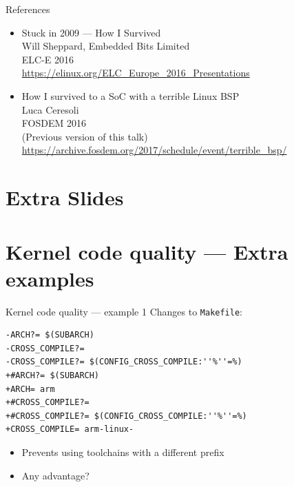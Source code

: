 \documentclass[xetex,table,aspectratio=169]{beamer}
\begin{document}
\begin{frame}{References}
  \begin{itemize}
    \item
      Stuck in 2009 --- How I Survived\\
      Will Sheppard, Embedded Bits Limited\\
      ELC-E 2016\\
      {\scriptsize\url{https://elinux.org/ELC_Europe_2016_Presentations}}
    \item
      How I survived to a SoC with a terrible Linux BSP\\
      Luca Ceresoli\\
      FOSDEM 2016\\
      (Previous version of this talk)\\
      {\scriptsize\url{https://archive.fosdem.org/2017/schedule/event/terrible_bsp/}}
  \end{itemize}
\end{frame}

\appendix

\section{Extra Slides}

\section{Kernel code quality --- Extra examples}

\begin{frame}[fragile]{Kernel code quality --- example 1}
  Changes to \texttt{Makefile}:

  \begin{verbatim}
-ARCH?= $(SUBARCH)
-CROSS_COMPILE?=
-CROSS_COMPILE?= $(CONFIG_CROSS_COMPILE:''%''=%)
+#ARCH?= $(SUBARCH)
+ARCH= arm
+#CROSS_COMPILE?=
+#CROSS_COMPILE?= $(CONFIG_CROSS_COMPILE:''%''=%)
+CROSS_COMPILE= arm-linux-
  \end{verbatim}

  \begin{itemize}
  \item Prevents using toolchains with a different prefix
  \item Any advantage?
  \end{itemize}
\end{frame}
\end{document}

